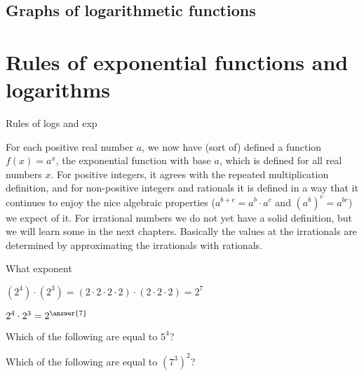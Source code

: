 \documentclass{ximera}
\begin{document}
\subsection{Graphs of logarithmetic functions}


\begin{example}
\end{example}

\section{Rules of exponential functions and logarithms}
Rules of logs and exp

For each positive real number $a$, we now have (sort of) defined a
function $f(x) = a^x$, the exponential function with base $a$, which
is defined for all real numbers $x$.  For positive integers, it agrees
with the repeated multiplication definition, and for non-positive
integers and rationals it is defined in a way that it continues to
enjoy the nice algebraic properties ($a^{b+c} = a^b \cdot a^c$ and
$(a^b)^c = a^{bc}$) we expect of it.  For irrational numbers we do not
yet have a solid definition, but we will learn some in the next
chapters.  Basically the values at the irrationals are determined by
approximating the irrationals with rationals.


\begin{question}
What exponent 
  \begin{hint}
		$(2^4) \cdot (2^3) = (2 \cdot 2\cdot 2 \cdot 2) \cdot  (2 \cdot 2\cdot 2) = 2^7 $
	\end{hint}

	$2^4 \cdot 2^3 = 2^{\answer{7}}$
\end{question}


\begin{question}
	Which of the following are equal to $5^4$?
	\begin{selectAll}
	\end{selectAll}
\end{question}

\begin{question}
	Which of the following are equal to $(7^3)^2$?
	\begin{selectAll}
		\choice{$7^5$}
		\choice[correct]{$(7^3) \cdot (7^3)$}
		\choice[correct]{$7^6$}
		\choice{$7\cdot 7 \cdot 7 \cdot 7 \cdot 7$}
	\end{selectAll}
\end{question}
\end{document}
